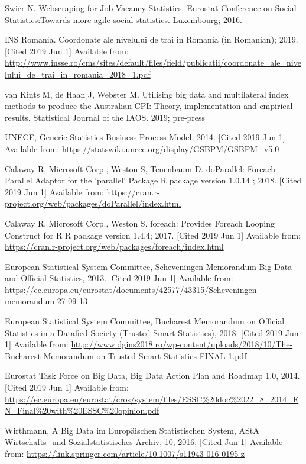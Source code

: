 \documentclass[]{article}
\begin{document}
\begin{thebibliography}{99}
Swier N. Webscraping for Job Vacancy Statistics. Eurostat Conference on Social Statistics:Towards more agile social statistics. Luxembourg; 2016.

INS Romania. Coordonate ale nivelului de trai in Romania (in Romanian); 2019. [Cited 2019 Jun 1] Available from:
\url{http://www.insse.ro/cms/sites/default/files/field/publicatii/coordonate_ale_nivelului_de_trai_in_romania_2018_1.pdf}

van Kints M, de Haan J, Webster M. Utilising big data and multilateral index methods to produce the Australian CPI: Theory, implementation and empirical results. Statistical Journal of the IAOS. 2019; pre-press

UNECE, Generic Statistics Business Process Model; 2014. [Cited 2019 Jun 1] Available from:
\url{https://statswiki.unece.org/display/GSBPM/GSBPM+v5.0}

Calaway R, Microsoft Corp., Weston S, Tenenbaum D. doParallel: Foreach Parallel Adaptor for the 'parallel' Package {R package version 1.0.14} ; 2018. [Cited 2019 Jun 1] Available from: \url{https://cran.r-project.org/web/packages/doParallel/index.html}

Calaway R, Microsoft Corp., Weston S. foreach: Provides Foreach Looping Construct for R {R package version 1.4.4}; 2017. [Cited 2019 Jun 1]
Available from: \url{https://cran.r-project.org/web/packages/foreach/index.html}  

European Statistical System Committee, Scheveningen Memorandum Big Data and Official Statistics, 2013. [Cited 2019 Jun 1]
Available from: \url{https://ec.europa.eu/eurostat/documents/42577/43315/Scheveningen-memorandum-27-09-13}

European Statistical System Committee,  Bucharest Memorandum on Official Statistics in a Datafied Society (Trusted Smart Statistics), 2018. [Cited 2019 Jun 1]
Available from: \url{http://www.dgins2018.ro/wp-content/uploads/2018/10/The-Bucharest-Memorandum-on-Trusted-Smart-Statistics-FINAL-1.pdf}

Eurostat Task Force on Big Data, Big Data Action Plan and Roadmap 1.0, 2014. [Cited 2019 Jun 1]
Available from:
\url{https://ec.europa.eu/eurostat/cros/system/files/ESSC%20doc%2022_8_2014_EN_Final%20with%20ESSC%20opinion.pdf} 

Wirthmann, A Big Data im Europäischen Statistischen System, AStA Wirtschafts- und Sozialstatistisches Archiv, 10, 2016; [Cited Jun 1]
Available from:
\url{https://link.springer.com/article/10.1007/s11943-016-0195-z}


\end{thebibliography}
\end{document}
